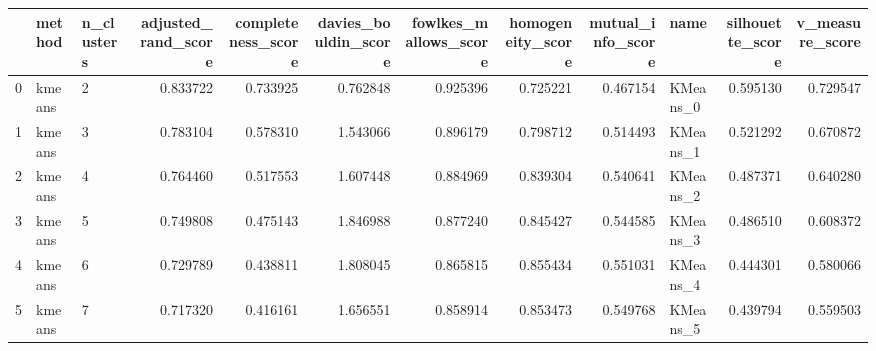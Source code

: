 \begin{tabular}{lllrrrrrrlrr}
\toprule
{} &  method & n\_clusters &  adjusted\_rand\_score &  completeness\_score &  davies\_bouldin\_score &  fowlkes\_mallows\_score &  homogeneity\_score &  mutual\_info\_score &      name &  silhouette\_score &  v\_measure\_score \\
\midrule
0 &  kmeans &          2 &             0.833722 &            0.733925 &              0.762848 &               0.925396 &           0.725221 &           0.467154 &  KMeans\_0 &          0.595130 &         0.729547 \\
1 &  kmeans &          3 &             0.783104 &            0.578310 &              1.543066 &               0.896179 &           0.798712 &           0.514493 &  KMeans\_1 &          0.521292 &         0.670872 \\
2 &  kmeans &          4 &             0.764460 &            0.517553 &              1.607448 &               0.884969 &           0.839304 &           0.540641 &  KMeans\_2 &          0.487371 &         0.640280 \\
3 &  kmeans &          5 &             0.749808 &            0.475143 &              1.846988 &               0.877240 &           0.845427 &           0.544585 &  KMeans\_3 &          0.486510 &         0.608372 \\
4 &  kmeans &          6 &             0.729789 &            0.438811 &              1.808045 &               0.865815 &           0.855434 &           0.551031 &  KMeans\_4 &          0.444301 &         0.580066 \\
5 &  kmeans &          7 &             0.717320 &            0.416161 &              1.656551 &               0.858914 &           0.853473 &           0.549768 &  KMeans\_5 &          0.439794 &         0.559503 \\
\bottomrule
\end{tabular}
